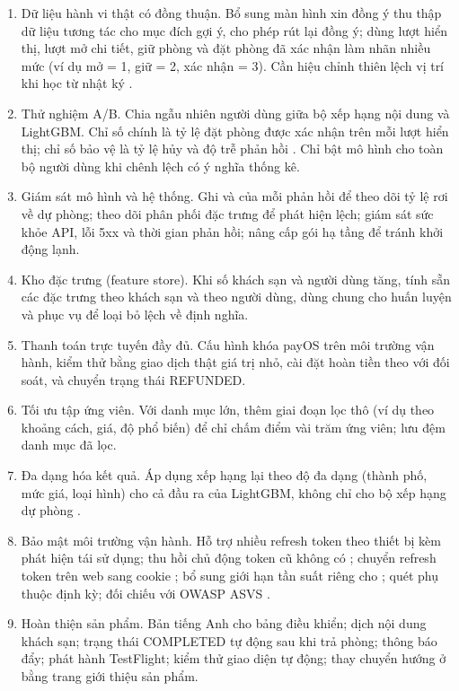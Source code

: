 \begin{enumerate}
\item Dữ liệu hành vi thật có đồng thuận. Bổ sung màn hình xin đồng ý thu thập dữ liệu tương tác cho mục đích gợi ý, cho phép rút lại đồng ý; dùng lượt hiển thị, lượt mở chi tiết, giữ phòng và đặt phòng đã xác nhận làm nhãn nhiều mức (ví dụ mở = 1, giữ = 2, xác nhận = 3). Cần hiệu chỉnh thiên lệch vị trí khi học từ nhật ký \cite{joachims2017}.
\item Thử nghiệm A/B. Chia ngẫu nhiên người dùng giữa bộ xếp hạng nội dung và LightGBM. Chỉ số chính là tỷ lệ đặt phòng được xác nhận trên mỗi lượt hiển thị; chỉ số bảo vệ là tỷ lệ hủy và độ trễ phản hồi \cite{kohavi2009}. Chỉ bật mô hình cho toàn bộ người dùng khi chênh lệch có ý nghĩa thống kê.
\item Giám sát mô hình và hệ thống. Ghi  và  của mỗi phản hồi để theo dõi tỷ lệ rơi về dự phòng; theo dõi phân phối đặc trưng để phát hiện lệch; giám sát sức khỏe API, lỗi 5xx và thời gian phản hồi; nâng cấp gói hạ tầng để tránh khởi động lạnh.
\item Kho đặc trưng (feature store). Khi số khách sạn và người dùng tăng, tính sẵn các đặc trưng theo khách sạn và theo người dùng, dùng chung cho huấn luyện và phục vụ để loại bỏ lệch về định nghĩa.
\item Thanh toán trực tuyến đầy đủ. Cấu hình khóa payOS trên môi trường vận hành, kiểm thử bằng giao dịch thật giá trị nhỏ, cài đặt hoàn tiền theo  với đối soát, và chuyển trạng thái REFUNDED.
\item Tối ưu tập ứng viên. Với danh mục lớn, thêm giai đoạn lọc thô (ví dụ theo khoảng cách, giá, độ phổ biến) để chỉ chấm điểm vài trăm ứng viên; lưu đệm danh mục đã lọc.
\item Đa dạng hóa kết quả. Áp dụng xếp hạng lại theo độ đa dạng (thành phố, mức giá, loại hình) cho cả đầu ra của LightGBM, không chỉ cho bộ xếp hạng dự phòng \cite{carbonell1998}.
\item Bảo mật môi trường vận hành. Hỗ trợ nhiều refresh token theo thiết bị kèm phát hiện tái sử dụng; thu hồi chủ động token cũ không có ; chuyển refresh token trên web sang cookie ; bổ sung giới hạn tần suất riêng cho ; quét phụ thuộc định kỳ; đối chiếu với OWASP ASVS \cite{owaspasvs}.
\item Hoàn thiện sản phẩm. Bản tiếng Anh cho bảng điều khiển; dịch nội dung khách sạn; trạng thái COMPLETED tự động sau khi trả phòng; thông báo đẩy; phát hành TestFlight; kiểm thử giao diện tự động; thay chuyển hướng ở  bằng trang giới thiệu sản phẩm.
\end{enumerate}

